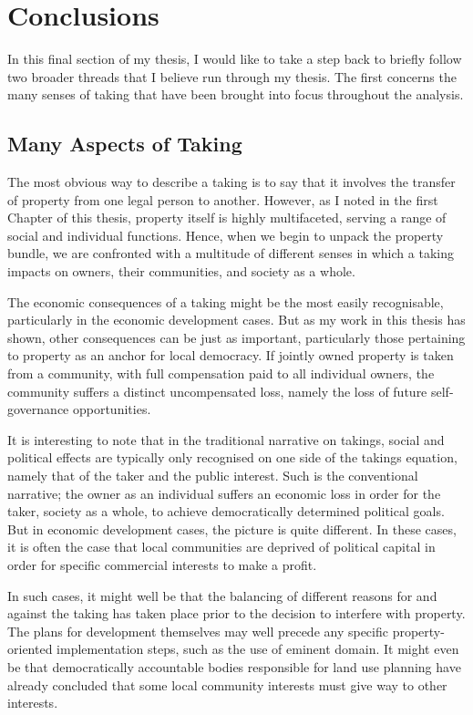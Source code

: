 \chapter{Conclusions}

In this final section of my thesis, I would like to take a step back to briefly follow two broader threads that I believe run through my thesis. The first concerns the many senses of taking that have been brought into focus throughout the analysis.

\section{Many Aspects of Taking}

The most obvious way to describe a taking is to say that it involves the transfer of property from one legal person to another. However, as I noted in the first Chapter of this thesis, property itself is highly multifaceted, serving a range of social and individual functions. Hence, when we begin to unpack the property bundle, we are confronted with a multitude of different senses in which a taking impacts on owners, their communities, and society as a whole.

The economic consequences of a taking might be the most easily recognisable, particularly in the economic development cases. But as my work in this thesis has shown, other consequences can be just as important, particularly those pertaining to property as an anchor for local democracy. If jointly owned property is taken from a community, with full compensation paid to all individual owners, the community suffers a distinct uncompensated loss, namely the loss of future self-governance opportunities.

It is interesting to note that in the traditional narrative on takings, social and political effects are typically only recognised on one side of the takings equation, namely that of the taker and the public interest. Such is the conventional narrative; the owner as an individual suffers an economic loss in order for the taker, society as a whole, to achieve democratically determined political goals. But in economic development cases, the picture is quite different. In these cases, it is often the case that local communities are deprived of political capital in order for specific commercial interests to make a profit. 

In such cases, it might well be that the balancing of different reasons for and against the taking has taken place prior to the decision to interfere with property. The plans for development themselves may well precede any specific property-oriented implementation steps, such as the use of eminent domain. It might even be that democratically accountable bodies responsible for land use planning have already concluded that some local community interests must give way to other interests.

